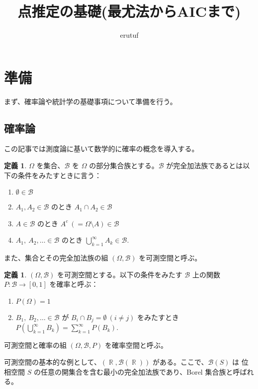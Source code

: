 \documentclass{jsarticle}
\title{点推定の基礎(最尤法からAICまで)}
\author{erutuf}
\DeclareMathOperator{\R}{\mathbb{R}}
\theoremstyle{definition}
\newtheorem{defn}[thm]{定義}
\begin{document}
\maketitle

\section{準備}

まず、確率論や統計学の基礎事項について準備を行う。

\subsection{確率論}

この記事では測度論に基いて数学的に確率の概念を導入する。

\begin{defn}
  $\Omega$ を集合、$\mathcal{B}$ を $\Omega$ の部分集合族とする。$\mathcal{B}$ が完全加法族であるとは以下の条件をみたすときに言う：
  \begin{enumerate}
    \item $\emptyset \in \mathcal{B}$
    \item $A_1, A_2 \in \mathcal{B}$ のとき $A_1 \cap A_2 \in \mathcal{B}$
    \item $A \in \mathcal{B}$ のとき $A^c\ (= \Omega \setminus A) \in \mathcal{B}$
    \item $A_1,\ A_2,\ldots \in \mathcal{B}$ のとき $\bigcup_{k=1}^\infty A_k \in \mathcal{B}$.
  \end{enumerate}
また、集合とその完全加法族の組 $(\Omega, \mathcal{B})$ を可測空間と呼ぶ。
\end{defn}

\begin{defn}
  $(\Omega, \mathcal{B})$ を可測空間とする。以下の条件をみたす $\mathcal{B}$ 上の関数 $P : \mathcal{B} \rightarrow [0, 1]$ を確率と呼ぶ：
  \begin{enumerate}
    \item $P(\Omega) = 1$
    \item $B_1,\ B_2, \ldots \in \mathcal{B}$ が $B_i \cap B_j = \emptyset \ (i \neq j)$ をみたすとき $P(\bigcup_{k=1}^\infty B_k) = \sum_{k=1}^\infty P(B_k)$.
  \end{enumerate}
可測空間と確率の組 $(\Omega, \mathcal{B}, P)$ を確率空間と呼ぶ。
\end{defn}

可測空間の基本的な例として、$(\R, \mathcal{B}(\R))$ がある。ここで、$\mathcal{B}(S)$ は 位相空間 $S$ の任意の開集合を含む最小の完全加法族であり、Borel 集合族と呼ばれる。
\end{document}
